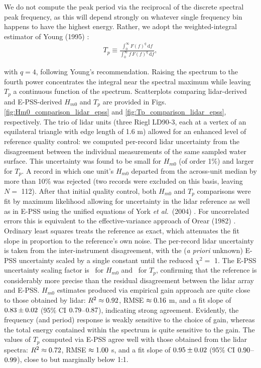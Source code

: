 \documentclass[letterpaper,draftcls,onecolumn]{IEEEtran}
\newcommand{\etal}{\emph{et al.}}
\begin{document}
We do not compute the peak period via the reciprocal of the discrete spectral peak frequency, as this will depend strongly on whatever single frequency bin happens to have the highest energy. Rather, we adopt the weighted-integral estimator of Young (1995) \cite{young_determination_1995}:
\begin{align}
    T_{p}\equiv\frac{\int_0^\infty F(f)^{q}~\mathrm{d}f}{\int_0^\infty f\,F(f)^{q}~\mathrm{d}f},
	\label{eq:peak_period}
\end{align}

\noindent with $q=4$, following Young's recommendation. Raising the spectrum to the fourth power concentrates the integral near the spectral maximum while leaving $T_p$ a continuous function of the spectrum. Scatterplots comparing lidar-derived and E-PSS-derived $H_{m0}$ and $T_{p}$ are provided in Figs. \ref{fig:Hm0_comparison_lidar_epss} and \ref{fig:Tp_comparison_lidar_epss}, respectively. The trio of lidar units (three Riegl LD90-3, each at a vertex of an equilateral triangle with edge length of 1.6 m) allowed for an enhanced level of reference quality control: we computed per-record lidar uncertainty from the disagreement between the individual measurements of the same sampled water surface. This uncertainty was found to be small for $H_{m0}$ (of order 1\%) and larger for $T_p$. A record in which one unit's $H_{m0}$ departed from the across-unit median by more than 10\% was rejected (two records were excluded on this basis, leaving $N=$ 112). After that initial quality control, both $H_{m0}$ and $T_p$ comparisons were fit by maximum likelihood allowing for uncertainty in the lidar reference as well as in E-PSS using the unified equations of York \etal~(2004) \cite{york_unified_2004}. For uncorrelated errors this is equivalent to the effective-variance approach of Orear (1982) \cite{orear_least_1982}. Ordinary least squares treats the reference as exact, which attenuates the fit slope in proportion to the reference's own noise. The per-record lidar uncertainty is taken from the inter-instrument disagreement, with the (\emph{a priori} unknown) E-PSS uncertainty scaled by a single constant until the reduced $\chi^2=$ 1. The E-PSS uncertainty scaling factor is \HmSigInfl~for $H_{m0}$ and \TpSigInfl~for $T_p$, confirming that the reference is considerably more precise than the residual disagreement between the lidar array and E-PSS. $H_{m0}$ estimates produced via empirical gain approach are quite close to those obtained by lidar: $R^2\approx0.92$, RMSE $\approx0.16$ m, and a fit slope of $0.83\pm0.02$ (95\% CI $0.79$--$0.87$), indicating strong agreement. Evidently, the frequency (and period) response is weakly sensitive to the choice of gain, whereas the total energy contained within the spectrum is quite sensitive to the gain. The values of $T_{p}$ computed via E-PSS agree well with those obtained from the lidar spectra: $R^2\approx0.72$, RMSE $\approx1.00$ s, and a fit slope of $0.95\pm0.02$ (95\% CI $0.90$--$0.99$), close to but marginally below 1:1.
\end{document}
